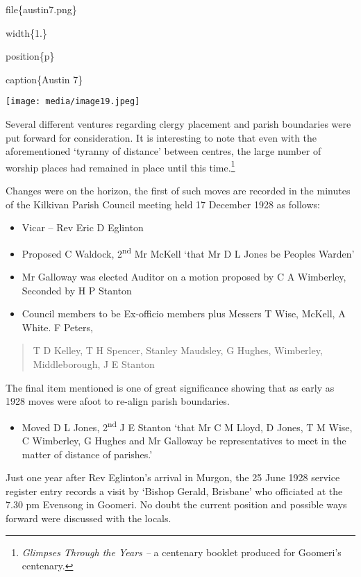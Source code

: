 file\{austin7.png\}

width\{1.\}

position\{p\}

caption\{Austin 7\}

\texttt{[image: media/image19.jpeg]}

Several different ventures regarding clergy placement and parish boundaries were put forward for consideration. It is interesting to note that even with the aforementioned `tyranny of distance' between centres, the large number of worship places had remained in place until this time.\footnote{\emph{Glimpses Through the Years --} a centenary booklet produced for Goomeri's centenary.}

Changes were on the horizon, the first of such moves are recorded in the minutes of the Kilkivan Parish Council meeting held 17 December 1928 as follows:

\begin{itemize}
\item
  Vicar -- Rev Eric D Eglinton
\item
  Proposed C Waldock, 2\textsuperscript{nd} Mr McKell `that Mr D L Jones be Peoples Warden'
\item
  Mr Galloway was elected Auditor on a motion proposed by C A Wimberley, Seconded by H P Stanton
\item
  Council members to be Ex-officio members plus Messers T Wise, McKell, A White. F Peters,
\end{itemize}

\begin{quote}
T D Kelley, T H Spencer, Stanley Maudsley, G Hughes, Wimberley, Middleborough, J E Stanton
\end{quote}

The final item mentioned is one of great significance showing that as early as 1928 moves were afoot to re-align parish boundaries.

\begin{itemize}
\item
  Moved D L Jones, 2\textsuperscript{nd} J E Stanton `that Mr C M Lloyd, D Jones, T M Wise, C Wimberley, G Hughes and Mr Galloway be representatives to meet in the matter of distance of parishes.'
\end{itemize}

Just one year after Rev Eglinton's arrival in Murgon, the 25 June 1928 service register entry records a visit by `Bishop Gerald, Brisbane' who officiated at the 7.30 pm Evensong in Goomeri. No doubt the current position and possible ways forward were discussed with the locals.

